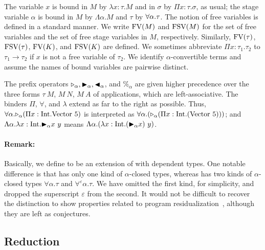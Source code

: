 The variable $x$ is bound in $M$ by $\lambda x:\tau.M$ and in $\sigma$
by $\Pi x:\tau.\sigma$, as usual; the stage variable $\alpha$ is
bound in $M$ by $\Lambda \alpha.M$ and $\tau$ by $\forall\alpha.\tau$.
The notion of free variables is defined in a standard manner.
We write $\text{FV}(M)$ and $\text{FSV}(M)$ for the set of free variables and the set of free stage variables in $M$, respectively.  Similarly, $\text{FV}(\tau)$, $\text{FSV}(\tau)$,
$\text{FV}(K)$, and $\text{FSV}(K)$ are defined.
We sometimes abbreviate $\Pi x:\tau_1.\tau_2$ to $\tau_1 \rightarrow \tau_2$ if
$x$ is not a free variable of $\tau_2$.
We identify $\alpha$-convertible terms and assume the names of bound variables are pairwise distinct.

The prefix operators ${\mathop{\triangleright}}_\alpha, {\mathop{\blacktriangleright}}_\alpha, {\mathop{\blacktriangleleft}}_\alpha$, and
$\%_\alpha$ are given higher precedence over the three forms $\tau\ M$, $M\ N$,
$M\ A$ of applications, which are left-associative. The binders $\Pi$,
$\forall$, and $\lambda$ extend as far to the right as possible.
Thus, $\F\alpha.\TW_{\alpha} (\Pi x:\I.\text{Vector}\ 5)$ is
interpreted as
$\F\alpha.(\TW_{\alpha} (\Pi x:\I.(\text{Vector}\ 5)))$; and
$\Lambda\alpha.\lambda x:\textrm{Int}.{\mathop{\blacktriangleright}}_\alpha x\ y$ means
$\Lambda\alpha.(\lambda x:\I.(\TB_\alpha x)\ y)$.

\paragraph{Remark:} Basically, we define \LMD to be an extension of
\LTP with dependent types.  One notable difference is that \LMD has
only one kind of \(\alpha\)-closed types, whereas \LTP has two kinds
of \(\alpha\)-closed types \(\forall\alpha.\tau\) and
\(\forall^\varepsilon\alpha.\tau\).  We have omitted the first kind,
for simplicity, and dropped the superscript $\varepsilon$ from the second. It
would not be difficult to recover the distinction to show properties related
to program residualization~\cite{Hanada2014}, although they are left as 
conjectures.

\subsection{Reduction}

